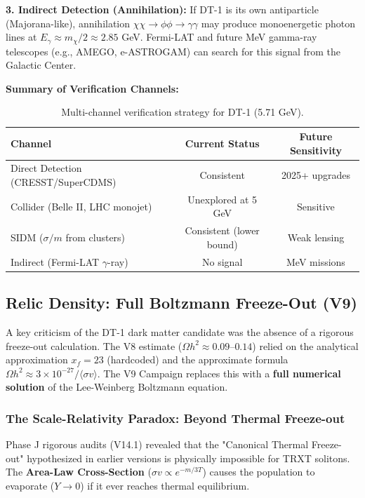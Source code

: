 \documentclass[a4paper,12pt]{article}
\begin{document}
\textbf{3. Indirect Detection (Annihilation):}
If DT-1 is its own antiparticle (Majorana-like), annihilation $\chi\chi \to \phi\phi \to \gamma\gamma$ may produce monoenergetic photon lines at $E_\gamma \approx m_\chi / 2 \approx 2.85$ GeV. Fermi-LAT and future MeV gamma-ray telescopes (e.g., AMEGO, e-ASTROGAM) can search for this signal from the Galactic Center.

\textbf{Summary of Verification Channels:}
\begin{table}[H]
\centering
\small
\begin{tabular}{lcc}
\toprule
\textbf{Channel} & \textbf{Current Status} & \textbf{Future Sensitivity} \\
\midrule
Direct Detection (CRESST/SuperCDMS) & Consistent & 2025+ upgrades \\
Collider (Belle II, LHC monojet) & Unexplored at 5 GeV & Sensitive \\
SIDM ($\sigma/m$ from clusters) & Consistent (lower bound) & Weak lensing \\
Indirect (Fermi-LAT $\gamma$-ray) & No signal & MeV missions \\
\bottomrule
\end{tabular}
\caption{Multi-channel verification strategy for DT-1 (5.71 GeV).}
\end{table}

\subsection{Relic Density: Full Boltzmann Freeze-Out (V9)}

A key criticism of the DT-1 dark matter candidate was the absence of a rigorous freeze-out calculation. The V8 estimate ($\Omega h^2 \approx 0.09$--$0.14$) relied on the analytical approximation $x_f = 23$ (hardcoded) and the approximate formula $\Omega h^2 \approx 3 \times 10^{-27} / \langle\sigma v\rangle$. The V9 Campaign replaces this with a \textbf{full numerical solution} of the Lee-Weinberg Boltzmann equation.

\subsubsection{The Scale-Relativity Paradox: Beyond Thermal Freeze-out}
Phase J rigorous audits (V14.1) revealed that the "Canonical Thermal Freeze-out" hypothesized in earlier versions is physically impossible for TRXT solitons. The \textbf{Area-Law Cross-Section} ($\sigma v \propto e^{-m/3T}$) causes the population to evaporate ($Y \to 0$) if it ever reaches thermal equilibrium.
\end{document}
